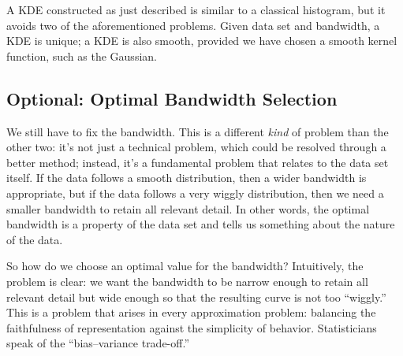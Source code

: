 A KDE constructed as just described is similar to a classical
histogram, but it avoids two of the aforementioned problems.  Given
data set and bandwidth, a KDE is unique; a KDE is also smooth,
provided we have chosen a smooth kernel function, such as the
Gaussian.

\vspace*{-6pt}
\subsection{Optional: Optimal Bandwidth Selection}


We still have to fix the bandwidth. This is a different \emph{kind} of
problem than the other two: it's not just a technical problem, which
could be resolved through a better method; instead, it's a fundamental
problem that relates to the data set itself.  If the data follows a
smooth distribution, then a wider bandwidth is appropriate, but if the
data follows a very wiggly distribution, then we need a smaller
bandwidth to retain all relevant detail. In other words, the optimal
bandwidth is a property of the data set and tells us something about
the nature of the data.

So how do we choose an optimal value for the bandwidth?  Intuitively,
the problem is clear: we want the bandwidth to be narrow enough to
retain all relevant detail but wide enough so that the resulting curve
is not too ``wiggly.'' This is a problem that arises in every
approximation problem: balancing the faithfulness of representation
against the simplicity of behavior. Statisticians speak of the
``bias--variance trade-off.''

